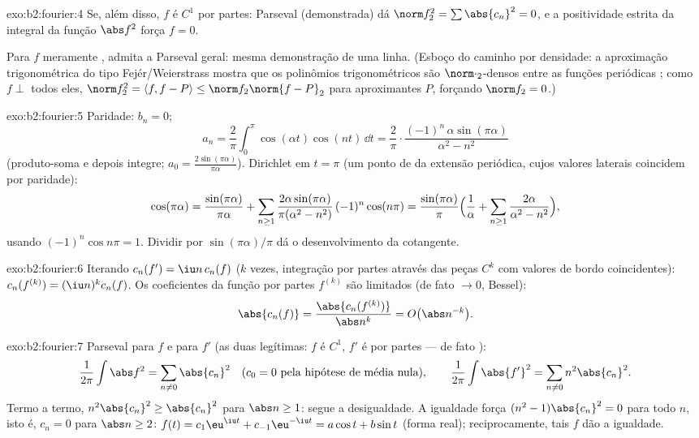 \begin{solution}{exo:b2:fourier:4}
Se, além disso, $f$ é $C^1$ por partes: Parseval (demonstrada) dá
$\norm f_2^2 = \sum\abs{c_n}^2 = 0$, e a positividade estrita da
integral da função  $\abs f^2$ força $f = 0$.

Para $f$ meramente , admita a Parseval geral: mesma demonstração
de uma linha. (Esboço do caminho por densidade: a aproximação
trigonométrica do tipo Fejér/Weierstrass mostra que os polinômios trigonométricos são
$\norm\cdot_2$-densos entre as funções periódicas ; como $f
\perp$ todos eles, $\norm f_2^2 = \langle f, f - P\rangle \leq
\norm f_2\norm{f - P}_2$ para aproximantes $P$, forçando $\norm f_2 =
0$.)
\end{solution}

\begin{solution}{exo:b2:fourier:5}
Paridade: $b_n = 0$;
\[
a_n = \frac{2}{\pi}\int_0^\pi \cos(\alpha t)\cos(nt)\,\dd t
= \frac{2}{\pi}\cdot
\frac{(-1)^n\,\alpha\sin(\pi\alpha)}{\alpha^2 - n^2}
\]
(produto-soma e depois integre; $a_0 =
\frac{2\sin(\pi\alpha)}{\pi\alpha}$). Dirichlet em $t = \pi$ (um
ponto de  da extensão periódica, cujos valores laterais
coincidem por paridade):
\[
\cos(\pi\alpha)
= \frac{\sin(\pi\alpha)}{\pi\alpha}
+ \sum_{n\geq1} \frac{2\alpha\sin(\pi\alpha)}{\pi(\alpha^2 -
n^2)}\,(-1)^n\cos(n\pi)
= \frac{\sin(\pi\alpha)}{\pi}\Bigl(\frac{1}{\alpha} +
\sum_{n\geq1}\frac{2\alpha}{\alpha^2 - n^2}\Bigr),
\]
usando $(-1)^n\cos n\pi = 1$. Dividir por $\sin(\pi\alpha)/\pi$
dá o desenvolvimento da cotangente.
\end{solution}

\begin{solution}{exo:b2:fourier:6}
Iterando $c_n(f') = \iu n\,c_n(f)$ ($k$ vezes, integração por
partes através das peças $C^{k}$ com valores de bordo coincidentes):
$c_n(f^{(k)}) = (\iu n)^k c_n(f)$. Os coeficientes da
função  por partes $f^{(k)}$ são limitados (de fato $\to 0$, Bessel):
\[
\abs{c_n(f)} = \frac{\abs{c_n(f^{(k)})}}{\abs n^k}
= O\bigl(\abs n^{-k}\bigr) .
\]
\end{solution}

\begin{solution}{exo:b2:fourier:7}
Parseval para $f$ e para $f'$ (as duas legítimas: $f$ é $C^1$, $f'$
é  por partes --- de fato ):
\[
\frac{1}{2\pi}\int \abs f^2 = \sum_{n\neq0} \abs{c_n}^2
\quad (c_0 = 0 \text{ pela hipótese de média nula}),
\qquad
\frac{1}{2\pi}\int \abs{f'}^2 = \sum_{n\neq0} n^2\abs{c_n}^2 .
\]
Termo a termo, $n^2\abs{c_n}^2 \geq \abs{c_n}^2$ para $\abs n \geq 1$:
segue a desigualdade. A igualdade força $(n^2 - 1)\abs{c_n}^2 = 0$
para todo $n$, isto é, $c_n = 0$ para $\abs n \geq 2$: $f(t) =
c_1\eu^{\iu t} + c_{-1}\eu^{-\iu t} = a\cos t + b\sin t$ (forma
real); reciprocamente, tais $f$ dão a igualdade.
\end{solution}

